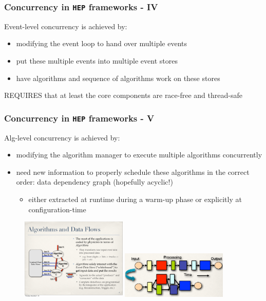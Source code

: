 \documentclass[9pt]{beamer}
\begin{document}
\begin{frame}[fragile]
\frametitle{Concurrency in \verb~HEP~ frameworks - IV}


\alert{Event-level} concurrency is achieved by:

\begin{itemize}
\item modifying the event loop to hand over multiple events
\item put these multiple events into multiple event stores
\item have algorithms and sequence of algorithms work on these stores
\end{itemize}

\alert{REQUIRES} that at least the core components are \alert{race-free} and \alert{thread-safe}
\end{frame}
\begin{frame}[fragile]
\frametitle{Concurrency in \verb~HEP~ frameworks - V}


\alert{Alg-level} concurrency is achieved by:

\begin{itemize}
\item modifying the algorithm manager to execute multiple algorithms concurrently
\item \alert{need} new information to properly schedule these algorithms in the correct
  order: \alert{data dependency graph} (hopefully acyclic!)
\begin{itemize}
\item either extracted at \alert{runtime} during a warm-up
    phase or \alert{explicitly} at \alert{configuration-time}
\end{itemize}
\end{itemize}

\begin{figure}
  \begin{center}
    \includegraphics[width=0.45\textwidth]{figs/data-flow.pdf}
    \includegraphics[width=0.45\textwidth]{figs/gaudi-hive-1.png}
  \end{center}
\end{figure}
\end{frame}
\end{document}
